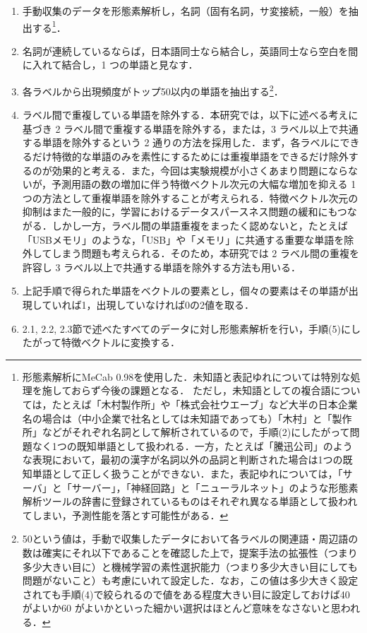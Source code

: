 \documentclass[japanese]{jnlp_1.4}
\begin{document}
\begin{enumerate}
\item
手動収集のデータを形態素解析し，名詞（固有名詞，サ変接続，一般）を抽出する\footnote{形態素解析にMeCab 0.98を使用した．未知語と表記ゆれについては特別な処理を施しておらず今後の課題となる． ただし，未知語としての複合語については，たとえば「木村製作所」や「株式会社ウエーブ」など大半の日本企業名の場合は（中小企業で社名としては未知語であっても）「木村」と「製作所」などがそれぞれ名詞として解析されているので，手順(2)にしたがって問題なく1つの既知単語として扱われる．一方，たとえば「騰迅公司」のような表現において，最初の漢字が名詞以外の品詞と判断された場合は1つの既知単語として正しく扱うことができない．また，表記ゆれについては，「サーバ」と「サーバー」，「神経回路」と「ニューラルネット」のような形態素解析ツールの辞書に登録されているものはそれぞれ異なる単語として扱われてしまい，予測性能を落とす可能性がある．}．
\item
名詞が連続しているならば，日本語同士なら結合し，英語同士なら空白を間に入れて結合し，1 つの単語と見なす．
\item
各ラベルから出現頻度がトップ50以内の単語を抽出する\footnote{50という値は，手動で収集したデータにおいて各ラベルの関連語・周辺語の数は確実にそれ以下であることを確認した上で，提案手法の拡張性（つまり多少大きい目に）と機械学習の素性選択能力（つまり多少大きい目にしても問題がないこと）も考慮にいれて設定した．なお，この値は多少大きく設定されても手順(4)で絞られるので値をある程度大きい目に設定しておけば40 がよいか60 がよいかといった細かい選択はほとんど意味をなさないと思われる．}．
\item
ラベル間で重複している単語を除外する．本研究では，以下に述べる考えに基づき 2 ラベル間で重複する単語を除外する，または，3 ラベル以上で共通する単語を除外するという 2 通りの方法を採用した．まず，各ラベルにできるだけ特徴的な単語のみを素性にするためには重複単語をできるだけ除外するのが効果的と考える．また，今回は実験規模が小さくあまり問題にならないが，予測用語の数の増加に伴う特徴ベクトル次元の大幅な増加を抑える 1 つの方法として重複単語を除外することが考えられる．特徴ベクトル次元の抑制はまた一般的に，学習におけるデータスパースネス問題の緩和にもつながる．しかし一方，ラベル間の単語重複をまったく認めないと，たとえば「USBメモリ」のような，「USB」や「メモリ」に共通する重要な単語を除外してしまう問題も考えられる．そのため，本研究では 2 ラベル間の重複を許容し 3 ラベル以上で共通する単語を除外する方法も用いる．
\item 上記手順で得られた単語をベクトルの要素とし，個々の要素はその単語が出現していれば1，出現していなければ0の2値を取る．
\item 2.1, 2.2, 2.3節で述べたすべてのデータに対し形態素解析を行い，手順(5)にしたがって特徴ベクトルに変換する．
\end{enumerate}
\end{document}
